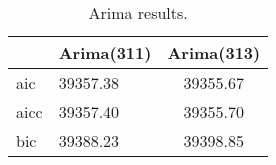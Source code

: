 \begin{table}[ht]
\centering
\caption[Arima results.]{Arima results.} 
\label{tab:chp_ts:arima_res_r}
\begin{tabular}{llc}
  \toprule  & Arima(311) & Arima(313) \\ 
  \midrule aic & 39357.38 & 39355.67 \\ 
  aicc & 39357.40 & 39355.70 \\ 
  bic & 39388.23 & 39398.85 \\ 
   \bottomrule \end{tabular}
\end{table}
